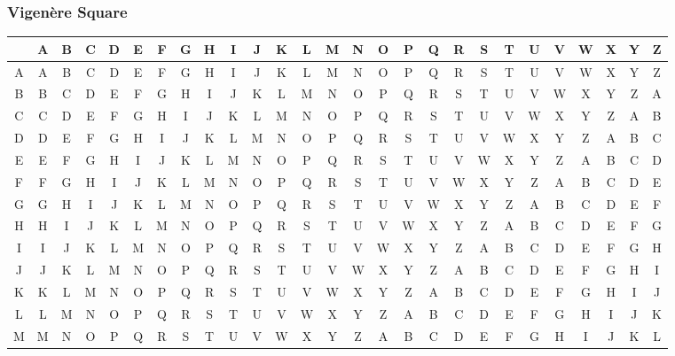 \documentclass[12pt]{beamer}
\begin{document}
\begin{frame}
	
	\frametitle{Vigen\`{e}re Square}
	
	\begin{adjustbox}{max width=\textwidth}
		\begin{tabular}{| c || c | c | c | c | c | c | c | c | c | c | c | c | c | c | c | c | c | c | c | c | c | c | c | c | c | c |}
			\hline
			& A & B & C & D & E & F & G & H & I & J & K & L & M & N & O & P & Q & R & S & T & U & V & W & X & Y & Z \\
			\hline\hline
			A & A & B & C & D & E & F & G & H & I & J & K & L & M & N & O & P & Q & R & S & T & U & V & W & X & Y & Z \\ \hline
			B & B & C & D & E & F & G & H & I & J & K & L & M & N & O & P & Q & R & S & T & U & V & W & X & Y & Z & A \\ \hline
			C & C & D & E & F & G & H & I & J & K & L & M & N & O & P & Q & R & S & T & U & V & W & X & Y & Z & A & B \\ \hline
			D & D & E & F & G & H & I & J & K & L & M & N & O & P & Q & R & S & T & U & V & W & X & Y & Z & A & B & C \\ \hline
			E & E & F & G & H & I & J & K & L & M & N & O & P & Q & R & S & T & U & V & W & X & Y & Z & A & B & C & D \\ \hline
			F & F & G & H & I & J & K & L & M & N & O & P & Q & R & S & T & U & V & W & X & Y & Z & A & B & C & D & E \\ \hline
			G & G & H & I & J & K & L & M & N & O & P & Q & R & S & T & U & V & W & X & Y & Z & A & B & C & D & E & F \\ \hline
			H & H & I & J & K & L & M & N & O & P & Q & R & S & T & U & V & W & X & Y & Z & A & B & C & D & E & F & G \\ \hline
			I & I & J & K & L & M & N & O & P & Q & R & S & T & U & V & W & X & Y & Z & A & B & C & D & E & F & G & H \\ \hline
			J & J & K & L & M & N & O & P & Q & R & S & T & U & V & W & X & Y & Z & A & B & C & D & E & F & G & H & I \\ \hline
			K & K & L & M & N & O & P & Q & R & S & T & U & V & W & X & Y & Z & A & B & C & D & E & F & G & H & I & J \\ \hline
			L & L & M & N & O & P & Q & R & S & T & U & V & W & X & Y & Z & A & B & C & D & E & F & G & H & I & J & K \\ \hline
			M & M & N & O & P & Q & R & S & T & U & V & W & X & Y & Z & A & B & C & D & E & F & G & H & I & J & K & L \\ \hline

\end{tabular}
\end{adjustbox}
\end{frame}
\end{document}
